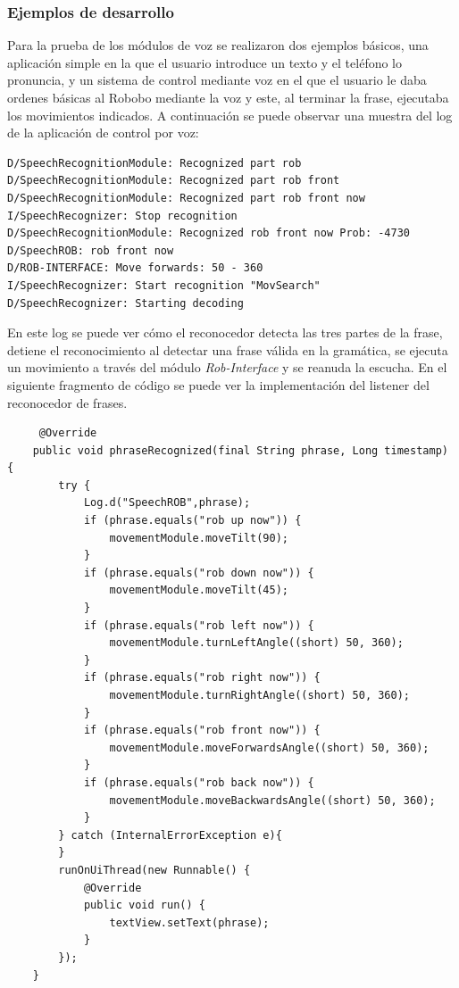 \subsubsection*{Ejemplos de desarrollo}

Para la prueba de los módulos de voz se realizaron dos ejemplos básicos, una aplicación simple en la que el usuario introduce un texto y el teléfono lo pronuncia, y un sistema de control mediante voz en el que el usuario le daba ordenes básicas al Robobo mediante la voz y este, al terminar la frase, ejecutaba los movimientos indicados.
A continuación se puede observar una muestra del log de la aplicación de control por voz:

\begin{verbatim}
D/SpeechRecognitionModule: Recognized part rob
D/SpeechRecognitionModule: Recognized part rob front
D/SpeechRecognitionModule: Recognized part rob front now
I/SpeechRecognizer: Stop recognition
D/SpeechRecognitionModule: Recognized rob front now Prob: -4730
D/SpeechROB: rob front now
D/ROB-INTERFACE: Move forwards: 50 - 360
I/SpeechRecognizer: Start recognition "MovSearch"
D/SpeechRecognizer: Starting decoding
\end{verbatim}

En este log se puede ver cómo el reconocedor detecta las tres partes de la frase, detiene el reconocimiento al detectar una frase válida en la gramática, se ejecuta un movimiento a través del módulo \textit{Rob-Interface} y se reanuda la escucha.
En el siguiente fragmento de código se puede ver la implementación del listener del reconocedor de frases.
\begin{lstlisting}
	 @Override
    public void phraseRecognized(final String phrase, Long timestamp) {
        try {
            Log.d("SpeechROB",phrase);
            if (phrase.equals("rob up now")) {
                movementModule.moveTilt(90);
            }
            if (phrase.equals("rob down now")) {
                movementModule.moveTilt(45);
            }
            if (phrase.equals("rob left now")) {
                movementModule.turnLeftAngle((short) 50, 360);
            }
            if (phrase.equals("rob right now")) {
                movementModule.turnRightAngle((short) 50, 360);
            }
            if (phrase.equals("rob front now")) {
                movementModule.moveForwardsAngle((short) 50, 360);
            }
            if (phrase.equals("rob back now")) {
                movementModule.moveBackwardsAngle((short) 50, 360);
            }
        } catch (InternalErrorException e){
        }
        runOnUiThread(new Runnable() {
            @Override
            public void run() {
                textView.setText(phrase);
            }
        });
    }
\end{lstlisting}
\newpage
